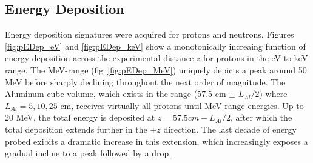 \documentclass[11pt]{article}
\begin{document}
\begin{multicols}{2}
\subsection{Energy Deposition}

Energy deposition signatures were acquired for protons and neutrons.  Figures \ref{fig:pEDep_eV} and \ref{fig:pEDep_keV} show a monotonically increaing function of energy deposition across the experimental distance $z$ for protons in the eV to keV range.  The MeV-range (fig~\ref{fig:pEDep_MeV}) uniquely depicts a peak around 50 MeV before sharply declining throughout the next order of magnitude.  The Aluminum cube volume, which exists in the range (57.5 cm $\pm$ $L_{Al}/2$) where $L_{Al}=5,10,25$ cm, receives virtually all protons until MeV-range energies.  Up to 20 MeV, the total energy is deposited at $z=57.5 cm - L_{Al}/2$, after which the total deposition extends further in the $+z$ direction.  The last decade of energy probed exibits a dramatic increase in this extension, which increasingly exposes a gradual incline to a peak followed by a drop.


\end{multicols}
\end{document}
